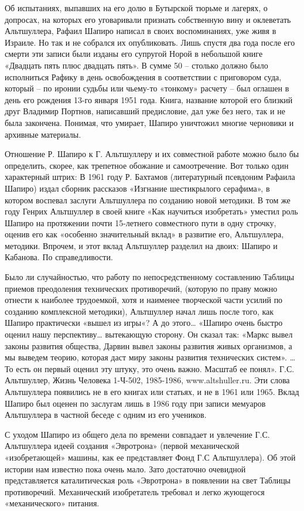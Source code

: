 \documentclass[11pt,a4paper]{article}
\begin{document}
Об испытаниях, выпавших на его долю в Бутырской тюрьме и лагерях, о допросах,
на которых его уговаривали признать собственную вину и оклеветать Альтшуллера,
Рафаил Шапиро написал в своих воспоминаниях, уже живя в Израиле. Но так и не
собрался их опубликовать. Лишь спустя два года после его смерти эти записи
были изданы его супругой Норой в небольшой книге «Двадцать пять плюс двадцать
пять». В сумме 50 -- столько должно было исполниться Рафику в день
освобождения в соответствии с приговором суда, который -- по иронии судьбы или
чьему-то «тонкому» расчету -- был оглашен в день его рождения 13-го января
1951 года. Книга, название которой его близкий друг Владимир Портнов,
написавший предисловие, дал уже без него, так и не была закончена. Понимая,
что умирает, Шапиро уничтожил многие черновики и архивные материалы.

Отношение Р. Шапиро к Г. Альтшуллеру и их совместной работе можно было бы
определить, скорее, как трепетное обожание и самоотречение. Вот только один
характерный штрих: В 1961 году Р. Бахтамов (литературный псевдоним Рафаила
Шапиро) издал сборник рассказов «Изгнание шестикрылого серафима», в котором
воспевал заслуги Альтшуллера по созданию новой методики. В том же году Генрих
Альтшуллер в своей книге «Как научиться изобретать» уместил роль Шапиро на
протяжении почти 15-летнего совместного пути в одну строчку, оценив его как
«особенно значительный вклад» в развитие его, Альтшуллера, методики. Впрочем,
и этот вклад Альтшуллер разделил на двоих: Шапиро и Кабанова. По
справедливости.

Было ли случайностью, что работу по непосредственному составлению Таблицы
приемов преодоления технических противоречий, (которую по праву можно отнести
к наиболее трудоемкой, хотя и наименее творческой части усилий по созданию
комплексной методики), Альтшуллер начал лишь после того, как Шапиро
практически «вышел из игры«? А до этого… «Шапиро очень быстро оценил нашу
перспективу… вытекающую сторону. Он сказал так: «Маркс вывел законы развития
общества, Дарвин вывел законы развития живых организмов, а мы выведем теорию,
которая даст миру законы развития технических систем». …То есть он первый
оценил эту штуку, это очень важно. Масштаб ее понял». Г.С. Альтшуллер, Жизнь
Человека 1-Ч-502, 1985-1986, www.altshuller.ru. Эти слова Альтшуллера
появились не в его книгах или статьях, и не в 1961 или 1965. Вклад Шапиро был
оценен по заслугам лишь в 1986 году при записи мемуаров Альтшуллера в частной
беседе с одним из его учеников.

С уходом Шапиро из общего дела по времени совпадает и увлечение
Г.С. Альтшуллера идеей создания «Эвротрона» (первой механической
«изобретающей» машины, как ее представляет Фонд Г.С Альтшуллера). Об этой
истории нам известно пока очень мало. Зато достаточно очевидной представляется
каталитическая роль «Эвротрона» в появлении на свет Таблицы
противоречий. Механический изобретатель требовал и легко жующегося
«механического» питания.
\end{document}
